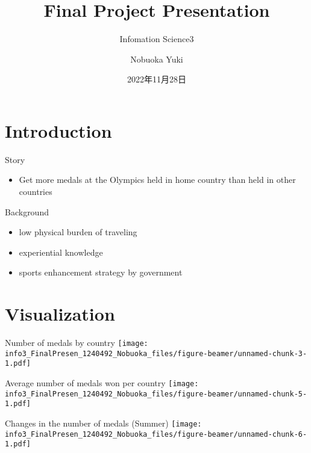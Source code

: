 \documentclass[
  ignorenonframetext,
  unicode]{beamer}
\institute[矢内研]{計量政治経済研究室}
\title{Final Project Presentation}
\subtitle{Infomation Science3}
\author{Nobuoka Yuki}
\date{2022年11月28日}
\providecommand{\tightlist}{%
  \setlength{\itemsep}{0pt}\setlength{\parskip}{0pt}}
\begin{document}
\frame{\titlepage}

\hypertarget{introduction}{%
\section{Introduction}\label{introduction}}

\begin{frame}{Story}
\protect\hypertarget{story}{}
\LARGE

\begin{itemize}
\tightlist
\item
  Get more medals at the Olympics held in home country than held in
  other countries
\end{itemize}
\end{frame}

\begin{frame}{Background}
\protect\hypertarget{background}{}
\LARGE

\begin{itemize}
\tightlist
\item
  low physical burden of traveling
\item
  experiential knowledge
\item
  sports enhancement strategy by government
\end{itemize}
\end{frame}

\hypertarget{visualization}{%
\section{Visualization}\label{visualization}}

\begin{frame}{Number of medals by country}
\protect\hypertarget{number-of-medals-by-country}{}
\texttt{[image: info3\_FinalPresen\_1240492\_Nobuoka\_files/figure-beamer/unnamed-chunk-3-1.pdf]}
\end{frame}

\begin{frame}{Average number of medals won per country}
\protect\hypertarget{average-number-of-medals-won-per-country}{}
\texttt{[image: info3\_FinalPresen\_1240492\_Nobuoka\_files/figure-beamer/unnamed-chunk-5-1.pdf]}
\end{frame}

\begin{frame}{Changes in the number of medals (Summer)}
\protect\hypertarget{changes-in-the-number-of-medals-summer}{}
\texttt{[image: info3\_FinalPresen\_1240492\_Nobuoka\_files/figure-beamer/unnamed-chunk-6-1.pdf]}
\end{frame}
\end{document}
